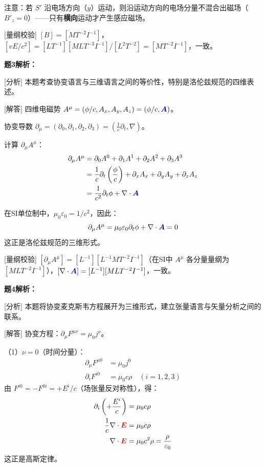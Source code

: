 \documentclass[11pt,a4paper,openany,oneside]{book}
\newcommand{\vecE}{\textcolor{red}{\vect{E}}}
\newcommand{\vecA}{\textcolor{blue!70!black}{\vect{A}}}
\newcommand{\eps}{\varepsilon}
\newcommand{\muz}{\mu_0}
\newcommand{\vect}[1]{\bm{#1}}
\newcommand{\divg}{\nabla\cdot}
\begin{document}
注意：若 $S'$ 沿电场方向（$y$）运动，则沿运动方向的电场分量不混合出磁场（$B'_z = 0$）——只有\textbf{横向}运动才产生感应磁场。

[量纲校验] $[B] = [MT^{-2}I^{-1}]$，$[vE/c^2] = [LT^{-1}][MLT^{-3}I^{-1}]/[L^2T^{-2}] = [MT^{-2}I^{-1}]$，一致。\qedsymbol

\textbf{题3解析：}

[分析] 本题考查协变语言与三维语言之间的等价性，特别是洛伦兹规范的四维表述。

[解答] 四维电磁势 $A^\mu = (\phi/c, A_x, A_y, A_z) = (\phi/c, \vecA)$。

协变导数 $\partial_\mu = (\partial_0, \partial_1, \partial_2, \partial_3) = (\frac{1}{c}\partial_t, \nabla)$。

计算 $\partial_\mu A^\mu$：
\begin{align*}
\partial_\mu A^\mu &= \partial_0 A^0 + \partial_1 A^1 + \partial_2 A^2 + \partial_3 A^3 \\
&= \frac{1}{c}\partial_t \left(\frac{\phi}{c}\right) + \partial_x A_x + \partial_y A_y + \partial_z A_z \\
&= \frac{1}{c^2}\partial_t\phi + \nabla\cdot\vecA
\end{align*}

在SI单位制中，$\muz\eps_0 = 1/c^2$，因此：
\[
\partial_\mu A^\mu = \muz\eps_0\partial_t\phi + \nabla\cdot\vecA = 0
\]
这正是洛伦兹规范的三维形式。\qedsymbol

[量纲校验] $[\partial_\mu A^\mu] = [L^{-1}][L^{-1}MT^{-2}I^{-1}]$（在SI中 $A^\mu$ 各分量量纲为 $[MLT^{-2}I^{-1}]$），$[\nabla\cdot\vecA] = [L^{-1}][MLT^{-2}I^{-1}]$，一致。\qedsymbol

\textbf{题4解析：}

[分析] 本题将协变麦克斯韦方程展开为三维形式，建立张量语言与矢量分析之间的联系。

[解答] 协变方程：$\partial_\mu F^{\mu\nu} = \muz j^\nu$。

（1）$\nu = 0$（时间分量）：
\begin{align*}
\partial_\mu F^{\mu 0} &= \muz j^0 \\
\partial_i F^{i0} &= \muz c\rho \quad (i=1,2,3)
\end{align*}
由 $F^{i0} = -F^{0i} = +E^i/c$（场张量反对称性），得：
\begin{align*}
\partial_i \left(+\frac{E^i}{c}\right) &= \muz c\rho \\
\frac{1}{c}\divg\vecE &= \muz c\rho \\
\divg\vecE &= \muz c^2\rho = \frac{\rho}{\eps_0}
\end{align*}
这正是高斯定律。
\end{document}

